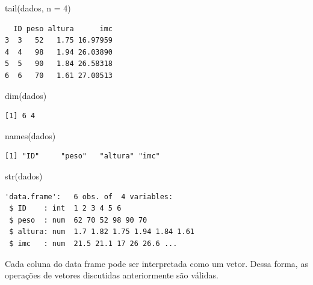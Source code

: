 \documentclass[
  letterpaper,
  DIV=11,
  numbers=noendperiod]{scrreprt}
\newenvironment{Shaded}{\begin{snugshade}}{\end{snugshade}}
\newcommand{\AttributeTok}[1]{\textcolor[rgb]{0.40,0.45,0.13}{#1}}
\newcommand{\CommentTok}[1]{\textcolor[rgb]{0.37,0.37,0.37}{#1}}
\newcommand{\DecValTok}[1]{\textcolor[rgb]{0.68,0.00,0.00}{#1}}
\newcommand{\FunctionTok}[1]{\textcolor[rgb]{0.28,0.35,0.67}{#1}}
\newcommand{\NormalTok}[1]{\textcolor[rgb]{0.00,0.23,0.31}{#1}}
\newcommand{\OtherTok}[1]{\textcolor[rgb]{0.00,0.23,0.31}{#1}}
\newcommand{\SpecialCharTok}[1]{\textcolor[rgb]{0.37,0.37,0.37}{#1}}
\begin{document}
\begin{Shaded}
\begin{Highlighting}[]
\FunctionTok{tail}\NormalTok{(dados, }\AttributeTok{n =} \DecValTok{4}\NormalTok{)}
\end{Highlighting}
\end{Shaded}

\begin{verbatim}
  ID peso altura      imc
3  3   52   1.75 16.97959
4  4   98   1.94 26.03890
5  5   90   1.84 26.58318
6  6   70   1.61 27.00513
\end{verbatim}

\begin{Shaded}
\begin{Highlighting}[]
\FunctionTok{dim}\NormalTok{(dados)}
\end{Highlighting}
\end{Shaded}

\begin{verbatim}
[1] 6 4
\end{verbatim}

\begin{Shaded}
\begin{Highlighting}[]
\FunctionTok{names}\NormalTok{(dados)}
\end{Highlighting}
\end{Shaded}

\begin{verbatim}
[1] "ID"     "peso"   "altura" "imc"   
\end{verbatim}

\begin{Shaded}
\begin{Highlighting}[]
\FunctionTok{str}\NormalTok{(dados)}
\end{Highlighting}
\end{Shaded}

\begin{verbatim}
'data.frame':   6 obs. of  4 variables:
 $ ID    : int  1 2 3 4 5 6
 $ peso  : num  62 70 52 98 90 70
 $ altura: num  1.7 1.82 1.75 1.94 1.84 1.61
 $ imc   : num  21.5 21.1 17 26 26.6 ...
\end{verbatim}

Cada coluna do data frame pode ser interpretada como um vetor. Dessa
forma, as operações de vetores discutidas anteriormente são válidas.

\begin{Shaded}
\end{Shaded}
\end{document}
